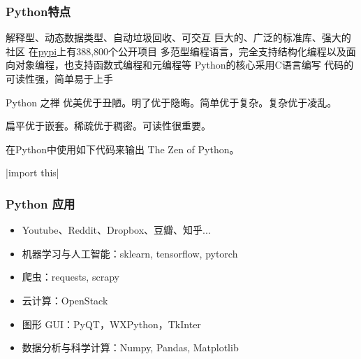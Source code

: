 \documentclass[10pt]{beamer}
\begin{document}
\begin{frame}[fragile]
\frametitle{Python特点}
\begin{outline}
    \1 解释型、动态数据类型、自动垃圾回收、可交互
    \1 巨大的、广泛的标准库、强大的社区
        \2 在\href{https://pypi.org/}{pypi}上有388,800个公开项目 
    \1 多范型编程语言，完全支持结构化编程以及面向对象编程，也支持函数式编程和元编程等
    \1 Python的核心采用C语言编写
    \1 代码的可读性强，简单易于上手
\end{outline}

\begin{block}{Python 之禅}
    优美优于丑陋。明了优于隐晦。\quad    简单优于复杂。复杂优于凌乱。 

    扁平优于嵌套。稀疏优于稠密。\quad    可读性很重要。

    \vspace{0.5cm}
    在Python中使用如下代码来输出 The Zen of Python。

    |import this|
\end{block}

\end{frame}

\begin{frame}
    \frametitle{Python 应用}
    \begin{itemize}
        \item Youtube、Reddit、Dropbox、豆瓣、知乎...
        \item 机器学习与人工智能：sklearn, tensorflow, pytorch
        \item 爬虫：requests, scrapy
        \item 云计算：OpenStack
        \item 图形 GUI：PyQT，WXPython，TkInter
        \item 数据分析与科学计算：Numpy, Pandas, Matplotlib
    \end{itemize}
\end{frame}
\end{document}

